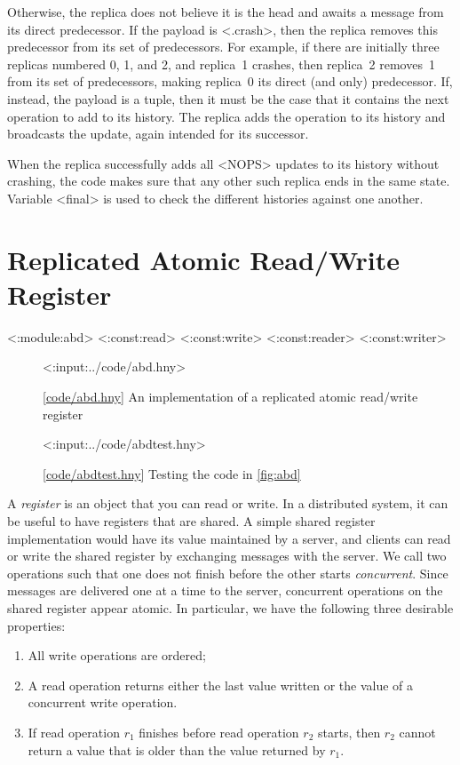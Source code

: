 \documentclass{report}
\newcommand{\harmonylink}[1]{%
[\href{https://harmony.cs.cornell.edu/#1}{\underline{#1}}]%
}
\newenvironment{code}{
\tcolorbox
}{
\endtcolorbox
}
\begin{document}
Otherwise, the replica does not believe it is the head and
awaits a message from its direct predecessor.
If the payload is <{.crash}>, then the replica removes this
predecessor from its set of predecessors.  For example, if there
are initially three replicas numbered 0, 1, and 2, and replica~1
crashes, then replica~2 removes~1 from its set of predecessors, making
replica~0 its direct (and only) predecessor.  If, instead, the payload
is a tuple, then it must be the case that it contains the next operation
to add to its history.  The replica adds the operation to its history
and broadcasts the update, again intended for its successor.

When the replica successfully adds all <{NOPS}> updates to its
history without crashing, the code makes sure that any other such replica
ends in the same state.  Variable <{final}> is used to check the
different histories against one another.

\chapter{Replicated Atomic Read/Write Register}
\label{ch:abd}

<{:module:abd}>
<{:const:read}>
<{:const:write}>
<{:const:reader}>
<{:const:writer}>

\begin{figure}
\begin{code}
<{:input:../code/abd.hny}>
\end{code}
\caption{\harmonylink{code/abd.hny} An implementation of a replicated atomic read/write register}
\label{fig:abd}
\end{figure}

\begin{figure}
\begin{code}
<{:input:../code/abdtest.hny}>
\end{code}
\caption{\harmonylink{code/abdtest.hny} Testing the code in \autoref{fig:abd}}
\label{fig:abdtest}
\end{figure}

A \emph{register} is an object that you can read or write.  In a distributed
system, it can be useful to have registers that are shared.
A simple shared register implementation
would have its value maintained by a server, and clients can read or write the
shared register by exchanging messages with the server.
We call two operations such that one does not finish before the other starts
\emph{concurrent}.
Since messages are delivered one at a time to the server,
concurrent operations on the shared register appear atomic.
In particular, we have the following three desirable properties:
\begin{enumerate}
\item All write operations are ordered;
\item A read operation returns either the last value written or the value of
a concurrent write operation.
\item If read operation $r_1$ finishes before read operation $r_2$ starts,
then $r_2$ cannot return a value that is older than the value returned
by $r_1$.
\end{enumerate}
\end{document}
